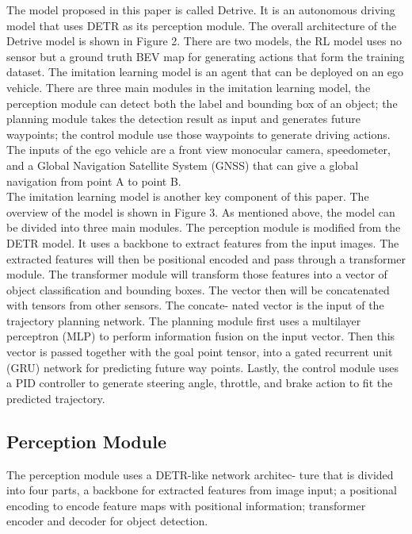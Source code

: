 \documentclass[conference]{IEEEtran}
\begin{document}
The model proposed in this paper is called Detrive. It is an autonomous driving model that uses DETR as its perception module. The overall architecture of the Detrive model is shown in Figure 2. There are two models, the RL model uses no sensor but a ground truth BEV map for generating actions that form the training dataset. The imitation learning model is an agent that can be deployed on an ego vehicle. There are three main modules in the imitation learning model, the perception module can detect both the label and bounding box of an object; the planning module takes the detection result as input and generates future waypoints; the control module use those waypoints to generate driving actions. The inputs of the ego vehicle are a front view monocular camera, speedometer, and a Global Navigation Satellite System (GNSS) that can give a global navigation from point A to point B.
\\
The imitation learning model is another key component of this paper. The overview of the model is shown in Figure 3. As mentioned above, the model can be divided into three main modules. The perception module is modified from the DETR model. It uses a backbone to extract features from the input images. The extracted features will then be positional encoded and pass through a transformer module. The transformer module will transform those features into a vector of object classification and bounding boxes. The vector then will be concatenated with tensors from other sensors. The concate- nated vector is the input of the trajectory planning network. The planning module first uses a multilayer perceptron (MLP) to perform information fusion on the input vector. Then this vector is passed together with the goal point tensor, into a gated recurrent unit (GRU) network for predicting future way points. Lastly, the control module uses a PID controller to generate steering angle, throttle, and brake action to fit the predicted trajectory.

\subsection{Perception Module}

The perception module uses a DETR-like network architec- ture that is divided into four parts, a backbone for extracted features from image input; a positional encoding to encode feature maps with positional information; transformer encoder and decoder for object detection.
\end{document}
